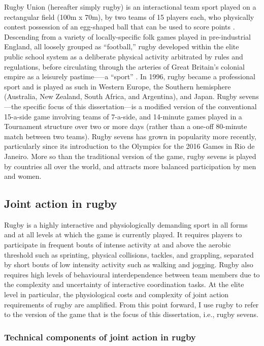 \begin{CJK}{UTF8}{gbsn}
Rugby Union (hereafter simply rugby) is an interactional team sport played on a rectangular field (100m x 70m), by two teams of 15 players each, who physically contest possession of an egg-shaped ball that can be used to score points \citep{IRB2014}.  Descending from a variety of locally-specific folk games played in pre-industrial England, all loosely grouped as ``football,'' rugby developed within the elite public school system as a deliberate physical activity arbitrated by rules and regulations, before circulating through the arteries of Great Britain's colonial empire as a leisurely pastime—--a ``sport'' \citep{Dunning2005}.  In 1996, rugby became a professional sport and is played as such in Western Europe, the Southern hemisphere (Australia, New Zealand, South Africa, and Argentina), and Japan. Rugby sevens---the specific focus of this dissertation---is a modified version of the conventional 15-a-side game involving teams of 7-a-side, and 14-minute games played in a Tournament structure over two or more days (rather than a one-off 80-minute match between two teams).  Rugby sevens has grown in popularity more recently, particularly since its introduction to the Olympics for the 2016 Games in Rio de Janeiro.  More so than the traditional version of the game, rugby sevens is played by countries all over the world, and attracts more balanced participation by men and women.

\subsection{Joint action in rugby \label{sect:jointActionRugby}}
Rugby is a highly interactive and physiologically demanding sport in all forms and at all levels at which the game is currently played. It requires players to participate in frequent bouts of intense activity at and above the aerobic threshold such as sprinting, physical collisions, tackles, and grappling, separated by short bouts of low intensity activity such as walking and jogging.  Rugby also requires high levels of behavioural interdependence between team members due to the complexity and uncertainty of interactive coordination tasks.  At the elite level in particular, the physiological costs and complexity of joint action requirements of rugby are amplified. From this point forward, I use rugby to refer to the version of the game that is the focus of this dissertation, i.e., rugby sevens.

\subsubsection{Technical components of joint action in rugby}


\end{CJK}
